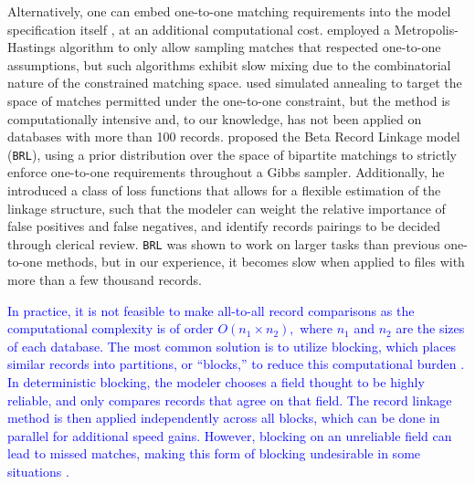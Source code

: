 \documentclass[ba]{imsart}
\begin{document}
Alternatively, one can embed one-to-one matching requirements into the model specification itself \citep{gutman2013bayesian, liseo_2011}, at an additional computational cost. \cite{Larsen05} employed a Metropolis-Hastings algorithm to only allow sampling matches that respected one-to-one assumptions, but such algorithms exhibit slow mixing due to the combinatorial nature of the constrained matching space. \cite{fortunato_2010} used simulated annealing to target the space of matches permitted under the one-to-one constraint, but the method is computationally intensive and, to our knowledge, has not been applied on databases with more than 100 records. \cite{sadinle_bayesian_2017} proposed the Beta Record Linkage model (\texttt{BRL}), using a prior distribution over the space of bipartite matchings to strictly enforce one-to-one requirements throughout a Gibbs sampler. Additionally, he introduced a class of loss functions that allows for a flexible estimation of the linkage structure, such that the modeler can weight the relative importance of false positives and false negatives, and identify records pairings to be decided through clerical review. \texttt{BRL} was shown to work on larger tasks than previous one-to-one methods, but in our experience, it becomes slow when applied to files with more than a few thousand records. 

\textcolor{blue}{In practice, it is not feasible to make all-to-all record comparisons as the computational complexity is of order $O(n_1 \times n_2),$ where $n_1$ and $n_2$ are the sizes of each database. The most common solution is to utilize blocking, which places similar records into partitions, or ``blocks,'' to reduce this computational burden \citep{steorts_comparison_2014, murray2016probabilistic}. In deterministic blocking, the modeler chooses a field thought to be highly reliable, and only compares records that agree on that field. The record linkage method is then applied independently across all blocks, which can be done in parallel for additional speed gains. However, blocking on an unreliable field can lead to missed matches, making this form of blocking undesirable in some situations \citep{steorts_comparison_2014}.}

 
\end{document}
